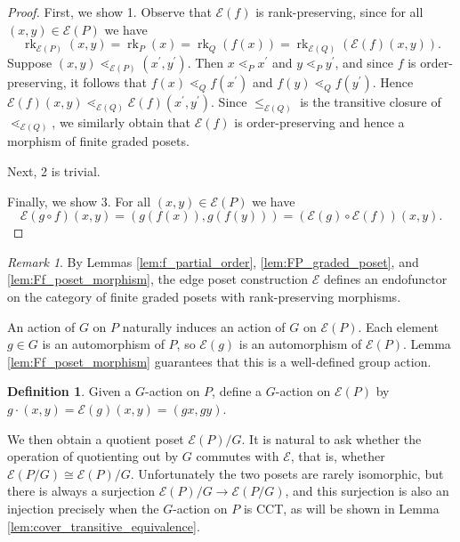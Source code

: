 \documentclass[smallextended, envcountsame, numbook]{svjour3}
\theoremstyle{plain}
\theoremstyle{definition}
\newtheorem{defn}[thm]{Definition}
\theoremstyle{remark}
\newtheorem{rmk}[thm]{Remark}
\numberwithin{equation}{section}
\newcommand\rk{\operatorname{rk}}
\begin{document}
\begin{proof}
First, we show 1.
Observe that $\mathcal E(f)$ is rank-preserving, since for all $(x, y)\in \mathcal E(P)$ we have 
$$\rk_{\mathcal E(P)}(x, y) = \rk_P(x) = \rk_Q(f(x)) = \rk_{\mathcal E(Q)}(\mathcal E(f)(x, y)).$$
Suppose $(x, y)\lessdot_{\mathcal E(P)} (x^\prime, y^\prime)$.  Then $x\lessdot_P x^\prime$ and $y\lessdot_P y^\prime$, and since $f$ is order-preserving, it follows that $f(x)\lessdot_Q f(x^\prime)$ and $f(y)\lessdot_Q f(y^\prime)$. Hence $\mathcal E(f)(x,y) \lessdot_{\mathcal E(Q)} \mathcal E(f)(x^\prime , y^\prime)$. Since $\le_{\mathcal E(Q)}$ is the transitive closure of $\lessdot_{\mathcal E(Q)}$, we similarly obtain that $\mathcal E(f)$ is order-preserving and hence a morphism of finite graded posets.

Next, 2 is trivial.

Finally, we show 3. For all $(x, y)\in \mathcal E(P)$ we have 
$$\mathcal E(g\circ f)(x, y) = (g(f(x)), g(f(y))) = \left(\mathcal E(g)\circ\mathcal E(f)\right)(x, y).$$
\end{proof}

\begin{rmk}
By Lemmas \ref{lem:f_partial_order}, \ref{lem:FP_graded_poset}, and \ref{lem:Ff_poset_morphism}, the edge poset construction $\mathcal{E}$ defines an endofunctor on the category of finite graded posets with rank-preserving morphisms.
\end{rmk}



An action of $G$ on $P$ naturally induces an action of $G$ on $\mathcal E(P).$ Each element $g \in G$ is an automorphism of $P$, so $\mathcal E(g)$ is an automorphism of $\mathcal E(P)$. Lemma \ref{lem:Ff_poset_morphism} guarantees that this is a well-defined group action. 


\begin{defn}\label{note:G_action_on_FP}
Given a $G$-action on $P$, define a $G$-action on $\mathcal E(P)$ by $g\cdot (x,y) = \mathcal{E}(g)(x,y) = (gx,gy)$.
\end{defn}

We then obtain a quotient poset $\mathcal E(P)/G$.  It is natural to ask whether the operation of quotienting out by $G$ commutes with $\mathcal E$, that is, whether $\mathcal E(P/G) \cong \mathcal E(P)/G$.  Unfortunately the two posets are rarely isomorphic, but there is always a surjection $\mathcal E(P)/G\rightarrow \mathcal E(P/G)$, and this surjection is also an injection precisely when the $G$-action on $P$ is CCT, as will be shown in Lemma \ref{lem:cover_transitive_equivalence}.
\end{document}
